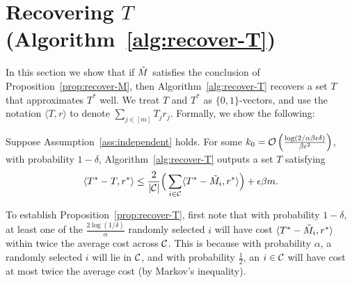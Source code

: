 \section{Recovering $T$ (Algorithm~\ref{alg:recover-T})}
\vskip -0.10in
\label{sec:approach-T}
\label{sec:rounding}

In this section we show that if $\tilde{M}$ satisfies the conclusion of 
Proposition~\ref{prop:recover-M}, then Algorithm~\ref{alg:recover-T} 
recovers a set $T$ that approximates $T^*$ well. We treat $T$ and $T^*$ 
as $\{0,1\}$-vectors, and use the notation $\langle T, r \rangle$ 
to denote $\sum_{j \in [m]} T_jr_j$. Formally, we show the following:
\begin{proposition}
\label{prop:recover-T}
Suppose Assumption~\ref{ass:independent} holds. For some 
$k_0 = \mathcal{O}\left( \frac{\log(2/\alpha\beta\epsilon\delta)}{\beta\epsilon^2} \right)$, 
with probability $1-\delta$, Algorithm~\ref{alg:recover-T} outputs a set $T$ satisfying 
\begin{equation}
\label{eq:recover-T}
\langle T^* - T, r^* \rangle  \leq \frac{2}{|\mathcal{C}|}\Big(\sum_{i \in \mathcal{C}} \langle T^* - \tilde{M}_{i}, r^* \rangle\Big) + \epsilon\beta m.
\end{equation}
\end{proposition}
To establish Proposition~\ref{prop:recover-T}, 
first note that with probability $1-\delta$, 
at least one of the $\frac{2\log(1/\delta)}{\alpha}$ randomly selected 
$i$ will have cost $\langle T^* - \tilde{M}_i, r^* \rangle$ 
within twice the average cost across $\mathcal{C}$. This 
is because with probability $\alpha$, a randomly selected 
$i$ will lie in $\mathcal{C}$, and with probability $\frac{1}{2}$, 
an $i \in \mathcal{C}$ will have cost at 
most twice the average cost (by Markov's inequality).

